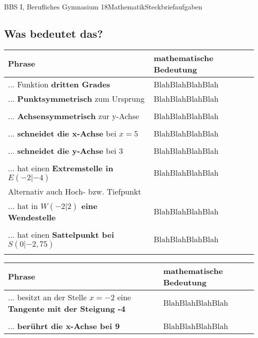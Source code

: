 \documentclass[11pt,oneside,openany,headings=optiontotoc,11pt,numbers=noenddot]{article}
\begin{document}
	\begin{worksheet}{BBS I, Berufliches Gymnasium 18}{Mathematik}{Steckbriefaufgaben}
		\noindent
		\subsection*{Was bedeutet das?}
		\renewcommand{\arraystretch}{1.5}
		\begin{tabularx}{\textwidth}{|L{5cm}|X|}
			\hline
			 \textbf{Phrase} & \textbf{mathematische Bedeutung}\\
			\hline
			\hline
			... Funktion \textbf{dritten Grades} & \color{white}BlahBlahBlahBlah\\
			\hline
			... \textbf{Punktsymmetrisch} zum Ursprung & \color{white}BlahBlahBlahBlah\\
			& \\
			\hline
			... \textbf{Achsensymmetrisch} zur y-Achse & \color{white}BlahBlahBlahBlah\\
			& \\
			\hline
			... \textbf{schneidet die x-Achse} bei \(x = 5\) & \color{white}BlahBlahBlahBlah\\
			& \\
			\hline
			... \textbf{schneidet die y-Achse} bei \(3\) & \color{white}BlahBlahBlahBlah\\
			& \\
			\hline
			... hat einen \textbf{Extremstelle in \(E(-2|-4)\)} & \color{white}BlahBlahBlahBlah\\
			\footnotesize{Alternativ auch Hoch- bzw. Tiefpunkt} & \normalsize\\
			\hline
			... hat in \textbf{\(W(-2|2)\) eine Wendestelle} & \color{white}BlahBlahBlahBlah\\
			& \\
			\hline
			... hat einen \textbf{Sattelpunkt bei \(S(0|-2,75)\)} & \color{white}BlahBlahBlahBlah\\
			& \\
			\hline
		\end{tabularx}
		\begin{tabularx}{\textwidth}{|L{5cm}|X|}
			\hline
			 \textbf{Phrase} & \textbf{mathematische Bedeutung}\\
			\hline
			\hline
			... besitzt an der Stelle \(x = -2\) eine \textbf{Tangente mit der Steigung -4} & \color{white}BlahBlahBlahBlah\\
			& \\
			\hline
			... \textbf{berührt die x-Achse bei 9} & \color{white}BlahBlahBlahBlah\\

\end{tabularx}
\end{worksheet}
\end{document}
